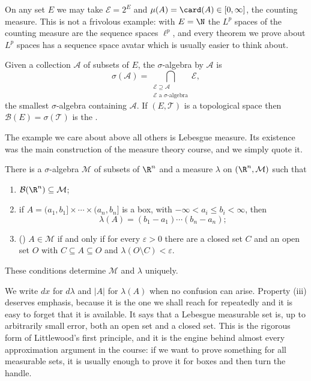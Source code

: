 \begin{example}
	On any set $E$ we may take $\mathcal{E} = 2^E$ and $\mu(A) = \card(A) \in [0,\infty]$, the counting measure. This is not a frivolous example: with $E = \N$ the $L^p$ spaces of the counting measure are the sequence spaces $\ell^p$, and every theorem we prove about $L^p$ spaces has a sequence space avatar which is usually easier to think about.
\end{example}

\begin{definition}
	Given a collection $\mathcal{A}$ of subsets of $E$, the $\sigma$-algebra  by $\mathcal{A}$ is
	$$\sigma(\mathcal{A}) = \bigcap_{\substack{\mathcal{E} \supseteq \mathcal{A} \\ \mathcal{E} \text{ a $\sigma$-algebra}}} \mathcal{E},$$
	the smallest $\sigma$-algebra containing $\mathcal{A}$. If $(E, \mathcal{T})$ is a topological space then $\mathcal{B}(E) = \sigma(\mathcal{T})$ is the .
\end{definition}

The example we care about above all others is Lebesgue measure. Its existence was the main construction of the measure theory course, and we simply quote it.

\begin{theorem}\label{aof-thm:lebesgue}
	There is a $\sigma$-algebra $\mathcal{M}$ of subsets of $\R^n$ and a measure $\lambda$ on $(\R^n, \mathcal{M})$ such that
	\begin{enumerate}[label=(\roman*)]
		\item $\mathcal{B}(\R^n) \subseteq \mathcal{M}$;
		\item if $A = (a_1, b_1] \times \cdots \times (a_n, b_n]$ is a box, with $-\infty < a_i \le b_i < \infty$, then
		$$\lambda(A) = (b_1 - a_1) \cdots (b_n - a_n);$$
		\item () $A \in \mathcal{M}$ if and only if for every $\varepsilon > 0$ there are a closed set $C$ and an open set $O$ with $C \subseteq A \subseteq O$ and $\lambda(O \setminus C) < \varepsilon$.
	\end{enumerate}
	These conditions determine $\mathcal{M}$ and $\lambda$ uniquely.
\end{theorem}

We write $dx$ for $d\lambda$ and $|A|$ for $\lambda(A)$ when no confusion can arise. Property (iii) deserves emphasis, because it is the one we shall reach for repeatedly and it is easy to forget that it is available. It says that a Lebesgue measurable set is, up to arbitrarily small error, both an open set and a closed set. This is the rigorous form of Littlewood's first principle, and it is the engine behind almost every approximation argument in the course: if we want to prove something for all measurable sets, it is usually enough to prove it for boxes and then turn the handle.

